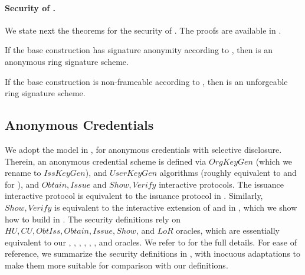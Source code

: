 \paragraph{Security of \CUASRing.} %
We state next the theorems for the security of \CUASRing. The proofs are
available in .

\begin{theorem}
  If the base \CUASGen construction has signature anonymity according to
  , then \CUASRing is an anonymous ring signature
  scheme.
\end{theorem}

\begin{theorem}
  If the base \CUASGen construction is non-frameable according to
  , then \CUASRing is an unforgeable ring signature
  scheme.
\end{theorem}

\subsection{Anonymous Credentials}
\label{ssec:related-models-ac}

We adopt the model in \cite{fhs19}, for anonymous credentials with selective
disclosure. Therein, an anonymous credential scheme is
defined via $OrgKeyGen$ (which we rename to $IssKeyGen$), and $UserKeyGen$
algorithms (roughly equivalent to
\IKeyGen and \UKeyGen for \UAS), and $Obtain,Issue$ and $Show,Verify$
interactive protocols. The issuance interactive protocol is equivalent to
the issuance protocol in \UAS. Similarly, $Show,Verify$ is equivalent to
the interactive extension of \Sign and \Verify in \UAS, which we show how
to build in . The security definitions rely on
$HU, CU, ObtIss, Obtain, Issue,Show$, and $LoR$ oracles, which are essentially
equivalent to our \HUGEN, \CUGEN, \OBTISS, \OBTAIN, \ISSUE, \SIGN, and \CHALb
oracles. We refer to \cite{fhs19} for the full details. For ease of reference,
we summarize the security definitions in , with inocuous
adaptations to make them more suitable for comparison with our definitions.

